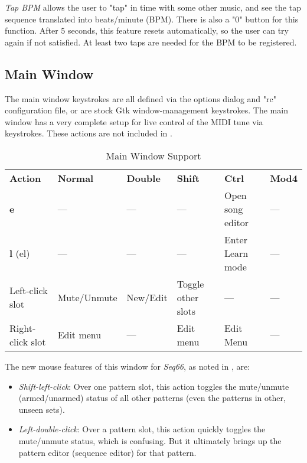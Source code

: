    \textsl{Tap BPM} allows the user to "tap" in time with some
   other music, and see the tap sequence translated into beats/minute (BPM).
   There is also a "0" button for this function.
   After 5 seconds, this feature resets automatically, so the user can try
   again if not satisfied.  At least two taps are needed for the
   BPM to be registered.

%

\subsection{Main Window}
\label{subsec:kbd_mouse_main_window}

   The main window keystrokes are all defined via the options dialog
   and "rc" configuration file, or are stock Gtk window-management keystrokes.
   The main window has a very complete setup for live control of the MIDI tune
   via keystrokes.  These actions are not included in
   .

   \begin{table}[H]
      \centering
      \caption{Main Window Support}
      \label{table:main_window_support}
      \begin{tabular}{l l l l l l}
         \textbf{Action} & \textbf{Normal} & \textbf{Double} &
            \textbf{Shift} & \textbf{Ctrl} & \textbf{Mod4} \\
         \textbf{e} & --- & --- & --- & Open song editor & --- \\
         \textbf{l} (el) & --- & --- & --- & Enter Learn mode & --- \\
         Left-click slot & Mute/Unmute & New/Edit & Toggle other slots &
            --- & --- \\
         Right-click slot & Edit menu & --- & Edit menu & Edit Menu &
            --- \\
      \end{tabular}
   \end{table}

   The new mouse features of this window for \textsl{Seq66},
   as noted in , are:

   \begin{itemize}
      \item \textsl{Shift-left-click}:
         Over one pattern slot, this action toggles the mute/unmute
         (armed/unarmed) status of all other patterns
         (even the patterns in other, unseen sets).
      \item \textsl{Left-double-click}:
         Over a pattern slot, this action quickly toggles the mute/unmute status,
         which is confusing.  But it ultimately brings up the pattern editor
         (sequence editor) for that pattern.
   \end{itemize}

